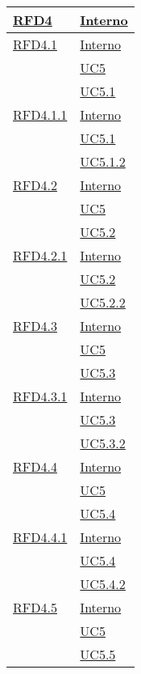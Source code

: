 \begin{longtable}{|>{\centering}m{5cm}|m{5cm}<{\centering}|}
\hyperlink{RFD4}{RFD4} & \hyperlink{Interno}{Interno}\\ \hline

\hyperlink{RFD4.1}{RFD4.1} & \hyperlink{Interno}{Interno}\\
& \hyperref[UC5]{UC5}\\
& \hyperref[UC5.1]{UC5.1}\\ \hline

\hyperlink{RFD4.1.1}{RFD4.1.1} & \hyperlink{Interno}{Interno}\\
& \hyperref[UC5.1]{UC5.1}\\
& \hyperref[UC5.1.2]{UC5.1.2}\\ \hline

\hyperlink{RFD4.2}{RFD4.2} & \hyperlink{Interno}{Interno}\\
& \hyperref[UC5]{UC5}\\
& \hyperref[UC5.2]{UC5.2}\\ \hline

\hyperlink{RFD4.2.1}{RFD4.2.1} & \hyperlink{Interno}{Interno}\\
& \hyperref[UC5.2]{UC5.2}\\
& \hyperref[UC5.2.2]{UC5.2.2}\\ \hline

\hyperlink{RFD4.3}{RFD4.3} & \hyperlink{Interno}{Interno}\\
& \hyperref[UC5]{UC5}\\
& \hyperref[UC5.3]{UC5.3}\\ \hline

\hyperlink{RFD4.3.1}{RFD4.3.1} & \hyperlink{Interno}{Interno}\\
& \hyperref[UC5.3]{UC5.3}\\
& \hyperref[UC5.3.2]{UC5.3.2}\\ \hline

\hyperlink{RFD4.4}{RFD4.4} & \hyperlink{Interno}{Interno}\\
& \hyperref[UC5]{UC5}\\
& \hyperref[UC5.4]{UC5.4}\\ \hline

\hyperlink{RFD4.4.1}{RFD4.4.1} & \hyperlink{Interno}{Interno}\\
& \hyperref[UC5.4]{UC5.4}\\
& \hyperref[UC5.4.2]{UC5.4.2}\\ \hline

\hyperlink{RFD4.5}{RFD4.5} & \hyperlink{Interno}{Interno}\\
& \hyperref[UC5]{UC5}\\
& \hyperref[UC5.5]{UC5.5}\\ \hline


\end{longtable}

